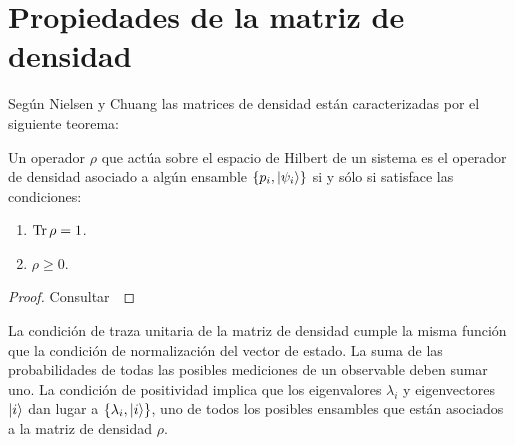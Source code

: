 \section{Propiedades de la matriz de densidad} %
\label{sec:density-matrices-properties}



Según Nielsen y Chuang \cite{nielsen_chuang_2011} las matrices
de densidad están caracterizadas por el siguiente teorema:
\begin{thm}\label{teo:density-operator}
Un operador $\rho$  que actúa sobre el espacio de Hilbert de un sistema 
es el operador de densidad asociado a algún ensamble 
$\{p_i, \ket{\psi _i} \}$ si y sólo si satisface las condiciones:
\begin{enumerate}
\item $\Tr \rho = 1$.
\item $\rho \geq 0$.
\end{enumerate}	
\end{thm} 
\begin{proof} Consultar~\cite[p.~101]{nielsen_chuang_2011} \end{proof}

La condición de traza unitaria de la matriz de densidad cumple la misma
función que la condición de normalización del vector de estado. La
suma de las probabilidades de todas las posibles mediciones 
de un observable deben sumar uno. La condición de positividad 
implica que los eigenvalores $\lambda_i$ y eigenvectores
$\ket{i}$ dan lugar a $\{\lambda_i, \ket{i}\}$, uno de todos los 
posibles ensambles que están asociados a la matriz de densidad $\rho$.

